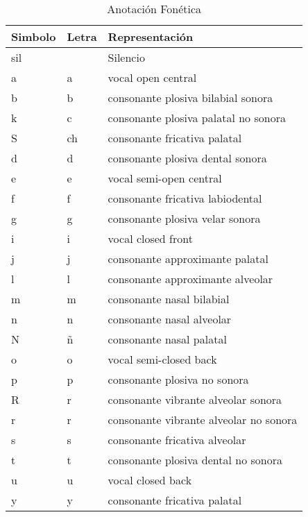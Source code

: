 \begin{table}[H]
\centering
\caption{Anotación Fonética}
\label{tab:anotacion_fonetica}
\begin{tabular}{|l|l|l|}
\hline
\textbf{Simbolo} & \textbf{Letra} & \textbf{Representación} \\ \hline
sil              & & Silencio                               \\ \hline
a                & a & vocal open central                   \\ \hline
b                & b &  consonante plosiva bilabial sonora   \\ \hline 
k                & c &  consonante plosiva palatal no sonora \\ \hline 
S                & ch &  consonante fricativa palatal        \\ \hline 
d                & d &  consonante plosiva dental sonora     \\ \hline 
e                & e &  vocal semi-open central              \\ \hline
f                & f &  consonante fricativa labiodental     \\ \hline 
g                & g &  consonante plosiva velar sonora      \\ \hline
i                & i &  vocal closed front                   \\ \hline
j                & j &  consonante approximante palatal       \\ \hline
l                & l &  consonante approximante alveolar      \\ \hline 
m                & m &  consonante nasal bilabial            \\ \hline 
n                & n &  consonante nasal alveolar            \\ \hline 
N                & ñ &  consonante nasal palatal             \\ \hline 
o                & o &  vocal semi-closed back               \\ \hline
p                & p &  consonante plosiva no sonora         \\ \hline 
R                & r &  consonante vibrante alveolar sonora   \\ \hline 
r                & r &  consonante vibrante alveolar no sonora \\ \hline
s                & s &  consonante fricativa alveolar         \\ \hline
t                & t &  consonante plosiva dental no sonora   \\ \hline
u                & u &  vocal closed back                    \\ \hline
y                & y &  consonante fricativa palatal         \\ \hline
\end{tabular}
\end{table}